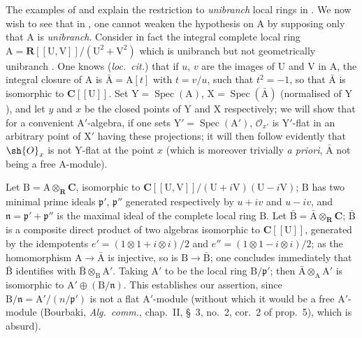 \begin{env}[11.7.5]
\label{IV.11.7.5}
The examples of  and  explain the restriction to \emph{unibranch} local rings in .
We now wish to see that in , one cannot weaken the hypothesis on $\mathrm{A}$ by supposing only that $\mathrm{A}$ is \emph{unibranch}.
Consider in fact the integral complete local ring $\mathrm{A}=\mathbf{R}[[\mathrm{U},\mathrm{V}]]/(\mathrm{U}^2+\mathrm{V}^2)$ which is unibranch but not geometrically unibranch .
One knows (\emph{loc.\ cit.}) that if $u$, $v$ are the images of $\mathrm{U}$ and $\mathrm{V}$ in $\mathrm{A}$, the integral closure of $\mathrm{A}$ is $\bar{\mathrm{A}}=\mathrm{A}[t]$ with $t=v/u$, such that $t^2=-1$, so that $\bar{\mathrm{A}}$ is isomorphic to $\mathbf{C}[[\mathrm{U}]]$.
Set $\mathrm{Y}=\operatorname{Spec}(\mathrm{A})$, $\mathrm{X}=\operatorname{Spec}(\bar{\mathrm{A}})$ (normalised of $\mathrm{Y}$ ), and let $y$ and $x$ be the closed points of $\mathrm{Y}$ and $\mathrm{X}$ respectively; we will show that for a convenient $\mathrm{A}'$-algebra, if one sets $\mathrm{Y}'=\operatorname{Spec}(\mathrm{A}')$, $\mathscr{O}_{x'}$ is $\mathrm{Y}'$-flat in an arbitrary point of $\mathrm{X}'$ having these projections; it will then follow evidently that $\sh{O}_x$ is not $\mathrm{Y}$-flat at the point $x$ (which is moreover trivially \emph{a priori}, $\bar{\mathrm{A}}$ not being a free $\mathrm{A}$-module).

Let $\mathrm{B}=\mathrm{A}\otimes_\mathbf{R}\mathbf{C}$, isomorphic to $\mathbf{C}[[\mathrm{U},\mathrm{V}]]/(\mathrm{U}+i\mathrm{V})(\mathrm{U}-i\mathrm{V})$; $\mathrm{B}$ has two minimal prime ideals $\mathfrak{p}'$, $\mathfrak{p}''$ generated respectively by $u+iv$ and $u-iv$, and $\mathfrak{n}=\mathfrak{p}'+\mathfrak{p}''$ is the maximal ideal of the complete local ring $\mathrm{B}$.
Let $\bar{\mathrm{B}}=\bar{\mathrm{A}}\otimes_\mathbf{R}\mathbf{C}$; $\bar{\mathrm{B}}$ is a composite direct product of two algebras isomorphic to $\mathbf{C}[[\mathrm{U}]]$, generated by the idempotents $e'=(1\otimes 1+i\otimes i)/2$ and $e''=(1\otimes 1-i\otimes i)/2$; as the homomorphism $\mathrm{A}\to\bar{\mathrm{A}}$ is injective, so is $\mathrm{B}\to\bar{\mathrm{B}}$; one concludes immediately that $\bar{\mathrm{B}}$ identifies with $\bar{\mathrm{B}}\otimes_\mathrm{B}\mathrm{A}'$.
Taking $\mathrm{A}'$ to be the local ring $\mathrm{B}/\mathfrak{p}'$; then $\bar{\mathrm{A}}\otimes_\mathrm{A}\mathrm{A}'$ is isomorphic to $\mathrm{A}'\oplus(\mathrm{B}/\mathfrak{n})$.
This establishes our assertion, since $\mathrm{B}/\mathfrak{n}=\mathrm{A}'/(n/\mathfrak{p}')$ is not a flat $\mathrm{A}'$-module (without which it would be a free $\mathrm{A}'$-module (Bourbaki, \emph{Alg.\ comm.}, chap.~II, \S~3, no.~2, cor.~2 of prop.~5), which is absurd).
\end{env}


